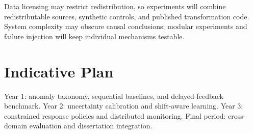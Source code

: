 \documentclass[11pt]{article}
\begin{document}
Data licensing may restrict redistribution, so experiments will combine redistributable sources, synthetic controls, and published transformation code. System complexity may obscure causal conclusions; modular experiments and failure injection will keep individual mechanisms testable.

\section*{Indicative Plan}
Year 1: anomaly taxonomy, sequential baselines, and delayed-feedback benchmark. Year 2: uncertainty calibration and shift-aware learning. Year 3: constrained response policies and distributed monitoring. Final period: cross-domain evaluation and dissertation integration.
\end{document}
